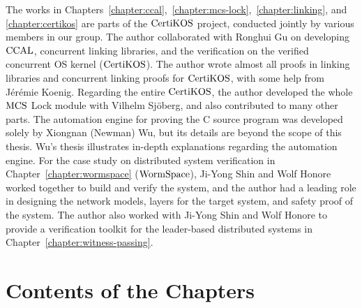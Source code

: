 The works in Chapters~\ref{chapter:ccal},~\ref{chapter:mcs-lock},~\ref{chapter:linking}, and \ref{chapter:certikos}  are parts of the $\mathrm{CertiKOS}$ project,
conducted jointly by various members in our group. 
The author collaborated with Ronghui Gu on developing  $\mathrm{CCAL}$, concurrent linking libraries, and the verification on the verified concurrent OS kernel ($\mathrm{CertiKOS}$). 
The author wrote almost all proofs in linking libraries and concurrent linking proofs for $\mathrm{CertiKOS}$, with some help from J{\'e}r{\'e}mie Koenig. 
Regarding the entire $\mathrm{CertiKOS}$, the author developed the whole $\mathrm{MCS}$ Lock module with Vilhelm Sj{\"o}berg, 
and also contributed to many other parts. 
The automation engine for proving the C source program was developed solely by Xiongnan (Newman) Wu, but its details are beyond the scope of this thesis. 
Wu’s thesis illustrates in-depth explanations regarding the automation engine. 
For the case study on distributed system verification in Chapter~\ref{chapter:wormspace} ($\mathrm{WormSpace}$), Ji-Yong Shin and Wolf Honore worked together to build and verify the system, 
and the author had a leading role in designing the network models, layers for the target system, and safety proof of the system. 
The author also worked with Ji-Yong Shin and Wolf Honore to provide a verification toolkit for the leader-based distributed systems in  Chapter~\ref{chapter:witness-passing}.


\section{Contents of the Chapters}
\label{chapter:introduction:sec:contents-of-the-chapters}

